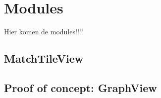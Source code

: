 \chapter{Modules}
\label{hoofdstuk:modules}

Hier komen de modules!!!!

\section{MatchTileView}

\section{Proof of concept: GraphView}